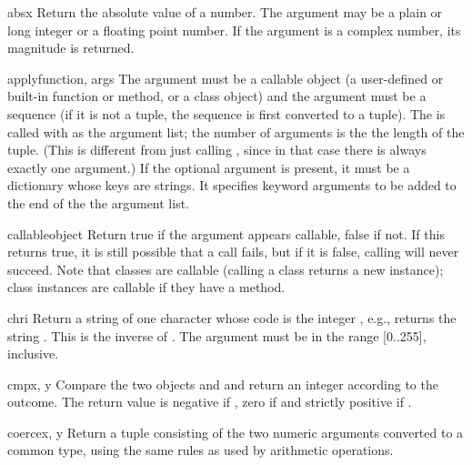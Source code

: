 \begin{funcdesc}{abs}{x}
  Return the absolute value of a number.  The argument may be a plain
  or long integer or a floating point number.  If the argument is a
  complex number, its magnitude is returned.
\end{funcdesc}

\begin{funcdesc}{apply}{function, args}
The  argument must be a callable object (a user-defined or
built-in function or method, or a class object) and the 
argument must be a sequence (if it is not a tuple, the sequence is
first converted to a tuple).  The  is called with
 as the argument list; the number of arguments is the the length
of the tuple.  (This is different from just calling
, since in that case there is always
exactly one argument.)
If the optional  argument is present, it must be a
dictionary whose keys are strings.  It specifies keyword arguments to
be added to the end of the the argument list.
\end{funcdesc}

\begin{funcdesc}{callable}{object}
Return true if the  argument appears callable, false if
not.  If this returns true, it is still possible that a call fails,
but if it is false, calling  will never succeed.  Note
that classes are callable (calling a class returns a new instance);
class instances are callable if they have a  method.
\end{funcdesc}

\begin{funcdesc}{chr}{i}
  Return a string of one character whose \ASCII{} code is the integer
  , e.g.,  returns the string .  This is the
  inverse of .  The argument must be in the range [0..255],
  inclusive.
\end{funcdesc}

\begin{funcdesc}{cmp}{x, y}
  Compare the two objects  and  and return an integer
  according to the outcome.  The return value is negative if , zero if  and strictly positive if
  .
\end{funcdesc}

\begin{funcdesc}{coerce}{x, y}
  Return a tuple consisting of the two numeric arguments converted to
  a common type, using the same rules as used by arithmetic
  operations.
\end{funcdesc}

